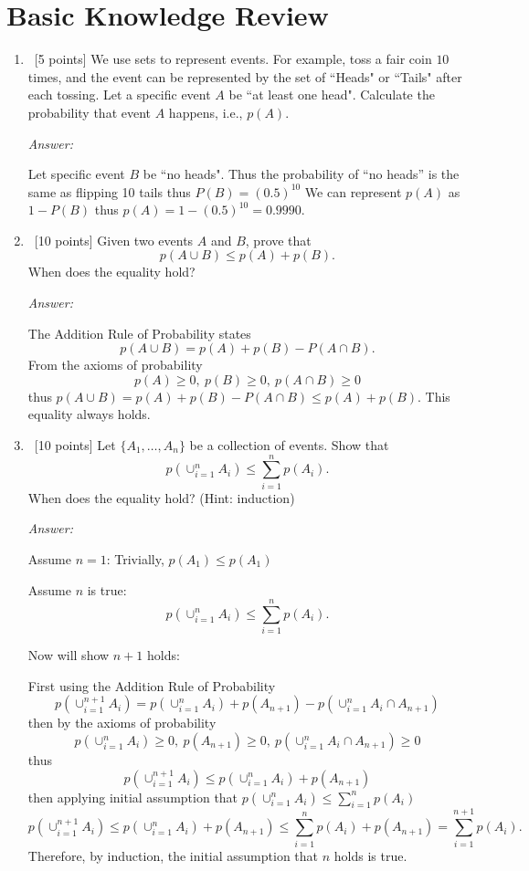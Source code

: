 \documentclass[12pt, fullpage,letterpaper]{article}
\begin{document}
\section*{Basic Knowledge Review}
\label{sec:q1}
\begin{enumerate}
\item~[5 points] We use sets to represent events. For example, toss a fair coin $10$ times, and the event can be represented by the set of ``Heads" or ``Tails" after each tossing. Let a specific event $A$ be ``at least one head". Calculate the probability that event $A$ happens, i.e., $p(A)$.

\textit{Answer:} 

Let specific event $B$ be ``no heads". Thus the probability of ``no heads'' is the same as flipping 10 tails thus $P(B)=(0.5)^{10}$
We can represent $p(A)$ as $1-P(B)$ thus $p(A) = 1-(0.5)^{10} = 0.9990$.

%

\item~[10 points] Given two events $A$ and $B$, prove that 
\[
p(A \cup B) \le p(A) + p(B).
\]
When does the equality hold?

\textit{Answer:} 

The Addition Rule of Probability states 
\[ p(A \cup B) = p(A) + p(B) - P(A \cap B).\]
From the axioms of probability
\[ p(A) \ge 0,\ p(B) \ge 0,\ p(A \cap B) \ge 0\]
thus $p(A \cup B) = p(A) + p(B) - P(A \cap B) \le p(A) + p(B)$. This equality always holds.

%

\item~[10 points] Let $\{A_1, \ldots, A_n\}$ be a collection of events. Show that
\[
p(\cup_{i=1}^n A_i) \le \sum_{i=1}^n p(A_i).
\]
When does the equality hold? (Hint: induction)

\textit{Answer:} 

Assume $n=1$: Trivially, $p(A_1) \le p(A_1)$

Assume $n$ is true:
\[
p(\cup_{i=1}^n A_i) \le 
\sum_{i=1}^n p(A_i).
\]

Now will show $n+1$ holds:

First using the Addition Rule of Probability 
\[
p(\cup_{i=1}^{n+1} A_i) = 
p(\cup_{i=1}^{n} A_i) + p(A_{n+1}) - p(\cup_{i=1}^{n}A_i \cap A_{n+1}) 
\]
then by the axioms of probability
\[p(\cup_{i=1}^{n} A_i) \ge 0,\ p(A_{n+1}) \ge 0,\ p(\cup_{i=1}^{n}A_i \cap A_{n+1}) \ge 0\]
thus
\[
p(\cup_{i=1}^{n+1} A_i) \le 
p(\cup_{i=1}^{n} A_i) + p(A_{n+1})  
\]
then applying initial assumption that $p(\cup_{i=1}^n A_i) \le \sum_{i=1}^n p(A_i)$
\[
p(\cup_{i=1}^{n+1} A_i) \le 
p(\cup_{i=1}^{n} A_i) + p(A_{n+1}) \le 
\sum_{i=1}^n p(A_i) + p(A_{n+1}) = 
\sum_{i=1}^{n+1} p(A_i).
\]
Therefore, by induction, the initial assumption that $n$ holds is true.
%


\end{enumerate}
\end{document}

